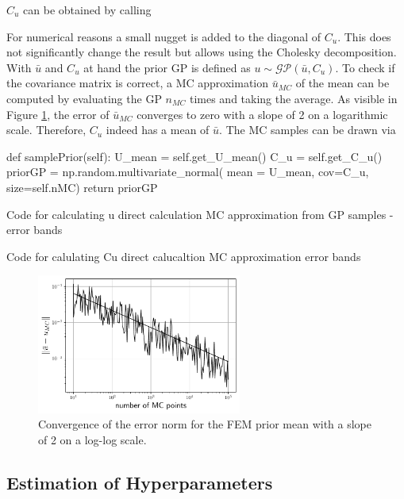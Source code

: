 \documentclass[%
  a4paper,oneside,%
  11pt,%
  smallchapters,
  style=printdev,
  extramargin,
  green,%
  rgb, <cmyk>
  ]{tubsbook}
\begin{document}
$C_u$ can be obtained by calling

For numerical reasons a small nugget is added to the diagonal of $C_u$. This does not significantly change the result but allows using the Cholesky decomposition.
With $\bar{u}$ and $C_u$ at hand the prior GP is defined as $u \sim \mathcal{GP}(\bar{u},C_u)$. To check if the covariance matrix is correct, a MC approximation $\bar{u}_{MC}$ of the mean can be computed by evaluating the GP $n_{MC}$ times and taking the average. As visible in Figure \ref{fig:u_mean_conv}, the error of $\bar{u}_{MC}$ converges to zero with a slope of 2 on a logarithmic scale. Therefore, $C_u$ indeed has a mean of $\bar{u}$.
The MC samples can be drawn via
\begin{python}
def samplePrior(self):
	U_mean = self.get_U_mean()
	C_u = self.get_C_u()
	priorGP = np.random.multivariate_normal(
		mean = U_mean, cov=C_u,
		size=self.nMC)
	return priorGP
\end{python}

Code for calculating u
direct calculation
MC approximation from GP samples
-error bands

Code for calulating Cu
direct calucaltion
MC approximation
error bands


\begin{figure}[!ht]
\includegraphics[width=0.6\textwidth]{pics/MCerrorConv.pdf}
\centering
\caption{Convergence of the error norm for the FEM prior mean with a slope of 2 on a log-log scale.}
\label{fig:u_mean_conv}
\end{figure}




\subsection{Estimation of Hyperparameters }
\end{document}
